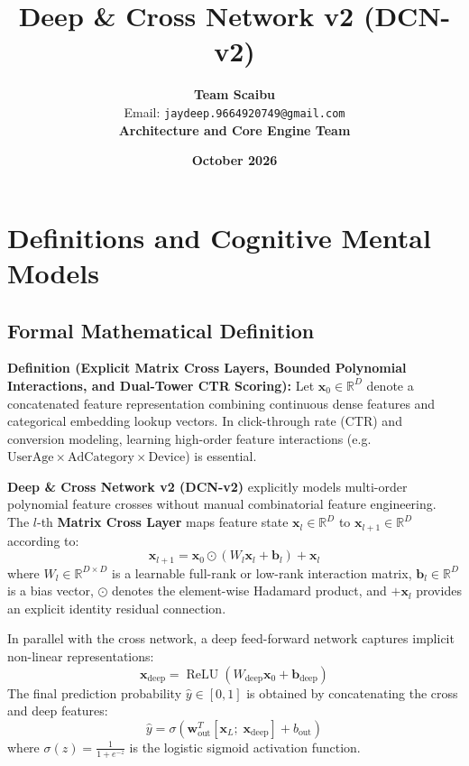 \documentclass[11pt,a4paper]{article}
\title{\textbf{Deep \& Cross Network v2 (DCN-v2)}}
\author{\textbf{Team Scaibu} \\ \small Email: \texttt{jaydeep.9664920749@gmail.com} \\ \small \textbf{Architecture and Core Engine Team}}
\date{\textbf{October 2026}}
\theoremstyle{definition}
\begin{document}
\maketitle

\section{Definitions and Cognitive Mental Models}

\subsection{Formal Mathematical Definition}
\textbf{Definition (Explicit Matrix Cross Layers, Bounded Polynomial Interactions, and Dual-Tower CTR Scoring):}
Let $\mathbf{x}_0 \in \mathbb{R}^D$ denote a concatenated feature representation combining continuous dense features and categorical embedding lookup vectors. In click-through rate (CTR) and conversion modeling, learning high-order feature interactions (e.g. $\text{UserAge} \times \text{AdCategory} \times \text{Device}$) is essential.

\textbf{Deep \& Cross Network v2 (DCN-v2)} explicitly models multi-order polynomial feature crosses without manual combinatorial feature engineering. The $l$-th \textbf{Matrix Cross Layer} maps feature state $\mathbf{x}_l \in \mathbb{R}^D$ to $\mathbf{x}_{l+1} \in \mathbb{R}^D$ according to:
{\boldmath
\begin{equation}
\mathbf{x}_{l+1} = \mathbf{x}_0 \odot \left( W_l \mathbf{x}_l + \mathbf{b}_l \right) + \mathbf{x}_l
\end{equation}
}
where $W_l \in \mathbb{R}^{D \times D}$ is a learnable full-rank or low-rank interaction matrix, $\mathbf{b}_l \in \mathbb{R}^D$ is a bias vector, $\odot$ denotes the element-wise Hadamard product, and $+\mathbf{x}_l$ provides an explicit identity residual connection.

In parallel with the cross network, a deep feed-forward network captures implicit non-linear representations:
{\boldmath
\begin{equation}
\mathbf{x}_{\text{deep}} = \operatorname{ReLU}\left( W_{\text{deep}} \mathbf{x}_0 + \mathbf{b}_{\text{deep}} \right)
\end{equation}
}
The final prediction probability $\widehat{y} \in [0, 1]$ is obtained by concatenating the cross and deep features:
{\boldmath
\begin{equation}
\widehat{y} = \sigma\left( \mathbf{w}_{\text{out}}^T [\mathbf{x}_L; \; \mathbf{x}_{\text{deep}}] + b_{\text{out}} \right)
\end{equation}
}
where $\sigma(z) = \frac{1}{1 + e^{-z}}$ is the logistic sigmoid activation function.
\end{document}
